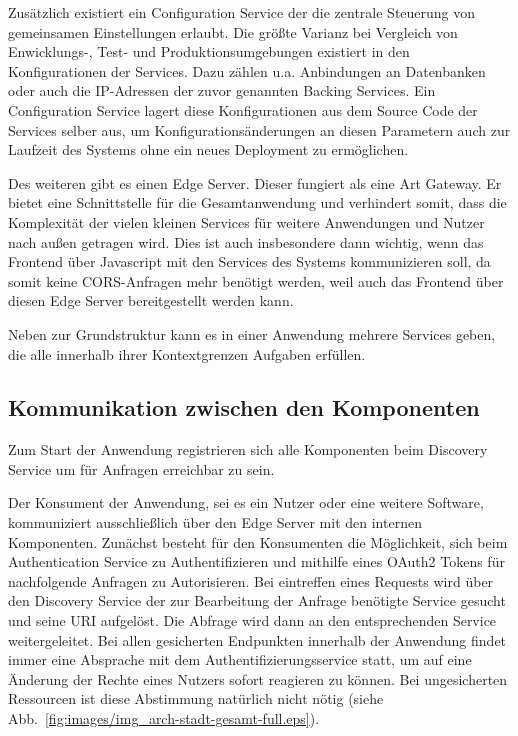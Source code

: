 \documentclass[12pt,a4paper,bibliography=totocnumbered,listof=totocnumbered]{scrartcl}
\begin{document}
Zusätzlich existiert ein Configuration Service der die zentrale Steuerung von gemeinsamen Einstellungen erlaubt. Die größte Varianz bei Vergleich von Enwicklungs-, Test- und Produktionsumgebungen existiert in den Konfigurationen der Services. Dazu zählen u.a. Anbindungen an Datenbanken oder auch die IP-Adressen der zuvor genannten Backing Services\cite{wiggins}. Ein Configuration Service lagert diese Konfigurationen aus dem Source Code der Services selber aus, um Konfigurationsänderungen an diesen Parametern auch zur Laufzeit des Systems ohne ein neues Deployment zu ermöglichen.

Des weiteren gibt es einen Edge Server. Dieser fungiert als eine Art Gateway. Er bietet eine Schnittstelle für die Gesamtanwendung und verhindert somit, dass die Komplexität der vielen kleinen Services für weitere Anwendungen und Nutzer nach außen getragen wird. Dies ist auch insbesondere dann wichtig, wenn das Frontend über Javascript mit den Services des Systems kommunizieren soll, da somit keine \ac{CORS}-Anfragen mehr benötigt werden, weil auch das Frontend über diesen Edge Server bereitgestellt werden kann.

Neben zur Grundstruktur kann es in einer Anwendung mehrere Services geben, die alle innerhalb ihrer Kontextgrenzen Aufgaben erfüllen. 


\subsection{Kommunikation zwischen den Komponenten}

Zum Start der Anwendung registrieren sich alle Komponenten beim Discovery Service um für Anfragen erreichbar zu sein.

Der Konsument der Anwendung, sei es ein Nutzer oder eine weitere Software, kommuniziert ausschließlich über den Edge Server mit den internen Komponenten. Zunächst besteht für den Konsumenten die Möglichkeit, sich beim Authentication Service zu Authentifizieren und mithilfe eines OAuth2 Tokens für nachfolgende Anfragen zu Autorisieren. Bei eintreffen eines Requests wird über den Discovery Service der zur Bearbeitung der Anfrage benötigte Service gesucht und seine \ac{URI} aufgelöst. Die Abfrage wird dann an den entsprechenden Service weitergeleitet. Bei allen gesicherten Endpunkten innerhalb der Anwendung findet immer eine Absprache mit dem Authentifizierungsservice statt, um auf eine Änderung der Rechte eines Nutzers sofort reagieren zu können. Bei ungesicherten Ressourcen ist diese Abstimmung natürlich nicht nötig (siehe Abb.~\ref{fig:images/img_arch-stadt-gesamt-full.eps}).
\end{document}
